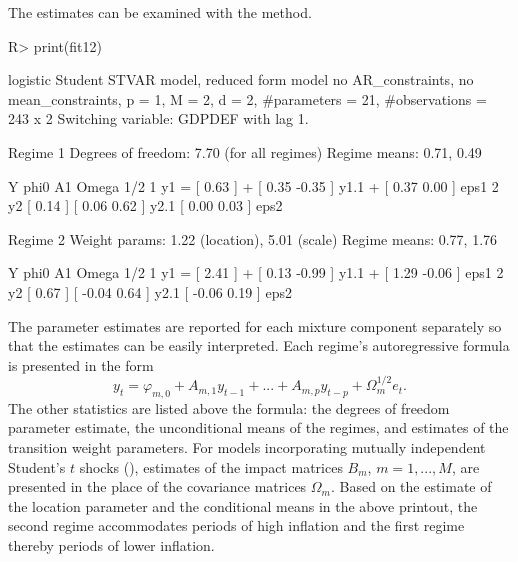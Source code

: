 \documentclass[nojss]{jss}
\begin{document}
The estimates can be examined with the  method.
%
\begin{CodeChunk}
\begin{CodeInput}
R> print(fit12)
\end{CodeInput}
\begin{CodeOutput}
logistic Student STVAR model, reduced form model no AR_constraints,
no mean_constraints,
  p = 1, M = 2, d = 2, #parameters = 21, #observations = 243 x 2
  Switching variable: GDPDEF with lag 1.

Regime 1
Degrees of freedom: 7.70 (for all regimes)
Regime means: 0.71, 0.49

   Y     phi0          A1                  Omega        1/2
1 y1 = [ 0.63 ] + [  0.35 -0.35 ] y1.1 + [  0.37 0.00 ]     eps1
2 y2   [ 0.14 ]   [  0.06  0.62 ] y2.1   [  0.00 0.03 ]     eps2

Regime 2
Weight params: 1.22 (location), 5.01 (scale)
Regime means: 0.77, 1.76

   Y     phi0          A1                  Omega         1/2
1 y1 = [ 2.41 ] + [  0.13 -0.99 ] y1.1 + [  1.29 -0.06 ]     eps1
2 y2   [ 0.67 ]   [ -0.04  0.64 ] y2.1   [ -0.06  0.19 ]     eps2
\end{CodeOutput}
\end{CodeChunk}
%
The parameter estimates are reported for each mixture component separately so that the estimates can be easily interpreted. Each regime's autoregressive formula is presented in the form
\begin{equation}
y_t = \varphi_{m,0} + A_{m,1}y_{t - 1} + ... + A_{m,p}y_{t - p} + \Omega_{m}^{1/2}e_{t}.
\end{equation}
The other statistics are listed above the formula: the degrees of freedom parameter estimate, the unconditional means of the regimes, and estimates of the transition weight parameters. For models incorporating mutually independent Student's $t$ shocks (), estimates of the impact matrices $B_m$, $m=1,...,M$, are presented in the place of the covariance matrices $\Omega_{m}$. Based on the estimate of the location parameter and the conditional means in the above printout, the second regime accommodates periods of high inflation and the first regime thereby periods of lower inflation.
\end{document}
